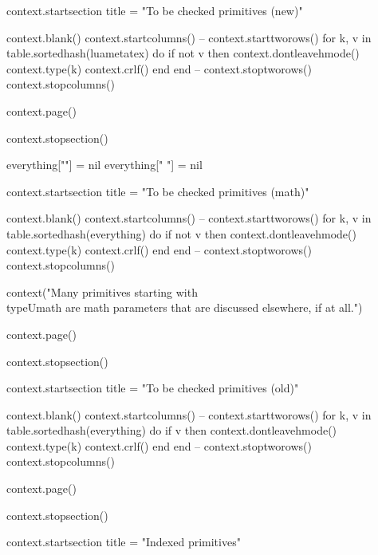         context.startsection { title = "To be checked primitives (new)" }

        context.blank()
        context.startcolumns()
     -- context.starttworows()
        for k, v in table.sortedhash(luametatex) do
            if not v then
                context.dontleavehmode()
                context.type(k)
                context.crlf()
            end
        end
     -- context.stoptworows()
        context.stopcolumns()

        context.page()

        context.stopsection()

        everything[""]  = nil
        everything[" "] = nil

        context.startsection { title = "To be checked primitives (math)" }

        context.blank()
        context.startcolumns()
     -- context.starttworows()
        for k, v in table.sortedhash(everything) do
            if not v then
                context.dontleavehmode()
                context.type(k)
                context.crlf()
            end
        end
     -- context.stoptworows()
        context.stopcolumns()

        context("Many primitives starting with \\type{Umath} are math parameters that are discussed elsewhere, if at all.")

        context.page()

        context.stopsection()

        context.startsection { title = "To be checked primitives (old)" }

        context.blank()
        context.startcolumns()
     -- context.starttworows()
        for k, v in table.sortedhash(everything) do
            if v then
                context.dontleavehmode()
                context.type(k)
                context.crlf()
            end
        end
     -- context.stoptworows()
        context.stopcolumns()

        context.page()

        context.stopsection()

        context.startsection { title = "Indexed primitives" }

